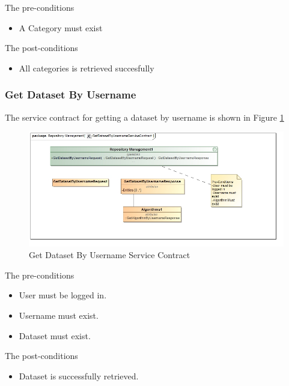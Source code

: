 The pre-conditions
\begin{itemize}
  \item A Category must exist

\end{itemize}

The post-conditions
\begin{itemize}
  \item All categories is retrieved succesfully
\end{itemize}

\subsubsection{Get Dataset By Username}
The service contract for getting a dataset by username is shown in Figure \ref{fig:getDatasetByUsername}
\begin{figure}[H]
  \begin{center}
    \includegraphics[scale=0.6]{../Diagrams and Charts/Test Data/GetDatasetByUsernameServiceContract.jpg}
    \caption{Get Dataset By Username Service Contract}
    \label{fig:getDatasetByUsername}
  \end{center}
  
\end{figure}  

The pre-conditions
\begin{itemize}
  \item User must be logged in.
  \item Username must exist.
  \item Dataset must exist.
\end{itemize}

The post-conditions
\begin{itemize}
  \item Dataset is successfully retrieved.
\end{itemize}


